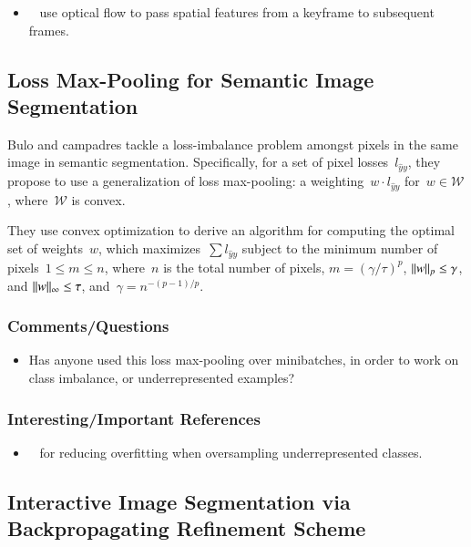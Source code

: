 \documentclass[a4paper, 12pt]{article}
\DeclarePairedDelimiter\norm{\lVert}{\rVert}%
\begin{document}
\begin{itemize}
        \item~\cite{zhu17dff} use optical flow to pass spatial features from a
                keyframe to subsequent frames.
\end{itemize}


\subsection{Loss Max-Pooling for Semantic Image Segmentation~\cite{bulo2017loss}}

Bulo and campadres tackle a loss-imbalance problem amongst pixels in the same
image in semantic segmentation. Specifically, for a set of pixel
losses~$l_{\hat{y} y}$, they propose to use a generalization of loss
max-pooling: a weighting~$w \cdot l_{\hat{y} y}$ for~$w \in \mathcal{W}$,
where~$\mathcal{W}$ is convex.

They use convex optimization to derive an algorithm for computing the optimal
set of weights~$w$, which maximizes~$\sum l_{\hat{y} y}$ subject to the minimum
number of pixels~$1 \leq m \leq n$, where~$n$ is the total number of pixels,
$m = {(\gamma / \tau)}^p$, $\norm{w}_p \leq \gamma$, and
$\norm{w}_\infty \leq \tau$, and~$\gamma = n^{-(p - 1)/p}$.


\subsubsection{Comments/Questions}

\begin{itemize}
        \item Has anyone used this loss max-pooling over minibatches, in order
                to work on class imbalance, or underrepresented examples?
\end{itemize}


\subsubsection{Interesting/Important References}

\begin{itemize}
        \item~\cite{bunkhumpornpat2009safe} for reducing overfitting when
                oversampling underrepresented classes.
\end{itemize}


\subsection{Interactive Image Segmentation via Backpropagating Reﬁnement
            Scheme~\cite{jang2019interactive}}
\end{document}
